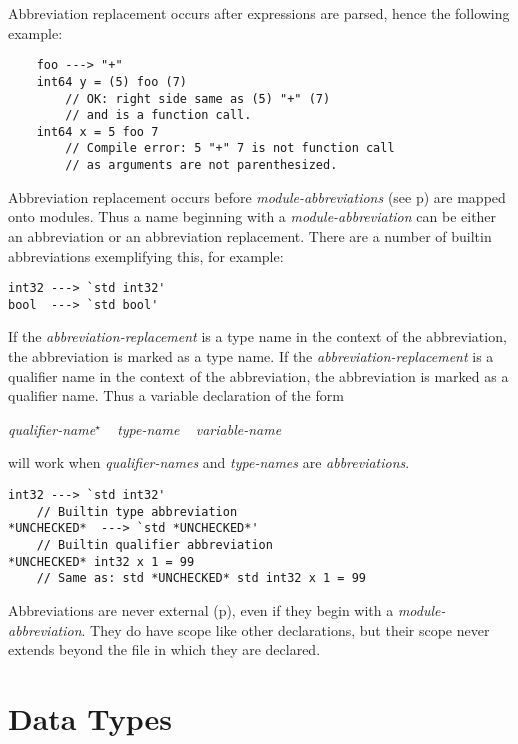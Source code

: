 \documentclass[12pt]{article}
\newcommand{\pagref}[1]{p\pageref{#1}}
\newcommand{\STAR}{{\Large $^\star$}}
\newenvironment{indpar}[1][0.3in]%
	{\begin{list}{}%
		     {\setlength{\itemsep}{0in}%
		      \setlength{\topsep}{0in}%
		      \setlength{\parsep}{1ex}%
		      \setlength{\labelwidth}{#1}%
		      \setlength{\leftmargin}{#1}%
		      \addtolength{\leftmargin}{\labelsep}}%
	 \item}%
	{\end{list}}
\begin{document}
Abbreviation replacement occurs after expressions are parsed, hence
the following example:
\begin{indpar}\begin{verbatim}
    foo ---> "+"
    int64 y = (5) foo (7)
        // OK: right side same as (5) "+" (7)
        // and is a function call.
    int64 x = 5 foo 7
        // Compile error: 5 "+" 7 is not function call
        // as arguments are not parenthesized.
\end{verbatim}\end{indpar}

Abbreviation replacement occurs before
{\em module-abbreviations} (see \pagref{MODULE-ABBREVIATION}) are
mapped onto modules.  Thus a name beginning with a
{\em module-abbreviation} can be either an abbreviation or an
abbreviation replacement.  There are a number of builtin
abbreviations exemplifying this, for example:
\begin{indpar}\begin{verbatim}
int32 ---> `std int32'
bool  ---> `std bool'
\end{verbatim}\end{indpar}

If the {\em abbreviation-replacement} is a type name in the
context of the abbreviation, the abbreviation is marked as a type
name. 
If the {\em abbreviation-replacement} is a qualifier name in the
context of the abbreviation, the abbreviation is marked as a qualifier
name.
Thus a variable declaration of the
form
\begin{center}
{\em qualifier-name}\STAR{} ~ {\em type-name} ~ {\em variable-name}
\end{center}
will work when {\em qualifier-names} and {\em type-names} are
{\em abbreviations}.
\begin{indpar}\begin{verbatim}
int32 ---> `std int32'
    // Builtin type abbreviation
*UNCHECKED*  ---> `std *UNCHECKED*'
    // Builtin qualifier abbreviation
*UNCHECKED* int32 x 1 = 99
    // Same as: std *UNCHECKED* std int32 x 1 = 99
\end{verbatim}\end{indpar}

Abbreviations are never external (\pagref{EXTERNAL}),%
\label{ABBREVIATIONS-ARE-NOT-EXTERNAL}
even if they begin with a {\em module-abbreviation}.
They do have scope like other declarations, but their scope
never extends beyond the file in which they are declared.

\section{Data Types}
\label{DATA-TYPES-TYPES}
\end{document}
